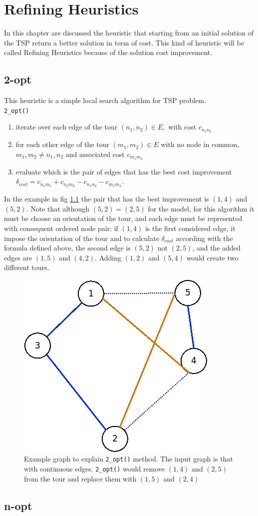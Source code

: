 \chapter{Refining Heuristics}
In this chapter are discussed the heuristic that starting from an initial solution of the TSP return a better solution in term of cost. This kind of heuristic will be called Refining Heuristics because of the solution cost improvement. 

\section{2-opt} \label{sec:best_2_opt}

This heuristic is a simple local search algorithm for TSP problem.\\
\texttt{2\_opt()} 
\begin{enumerate}
	\item iterate over each edge of the tour $ (n_1,n_2) \in E, $ with cost $ c_{n_1n_2} $
	\item for each other edge of the tour $ (m_1, m_2) \in E $ with no node in common, $ m_1,m_2 \ne n_1,n_2 $ and associated cost $ c_{m_1m_2} $
	\item evaluate which is the pair of edges that has the best cost improvement $ \delta_{cost} = c_{n_1m_1} + c_{n_2m_2} - c_{n_1n_2} - c_{m_1m_2} $.
\end{enumerate}
In the example in fig \ref{fig:2_opt_graph} the pair that has the best improvement is $ (1,4) $ and $ (5,2) $. Note that although $ (5,2) = (2,5) $ for the model, for this algorithm it must be choose an orientation of the tour, and each edge must be represented with consequent ordered node pair: if $ (1,4) $ is the first considered edge, it impose the orientation of the tour and to calculate $ \delta_{cost} $ according with the formula defined above, the second edge is $ (5,2) $ not $ (2,5) $, and the added edges are $ (1,5) $ and $ (4,2) $. Adding $ (1,2) $ and $ (5,4) $ would create two different tours.


\begin{figure}[h]
	\centering
	\includegraphics[width=.3\columnwidth]{img/2_opt_graph.png}
	\caption{Example graph to explain \texttt{2\_opt()} method. The input graph is that with continuous edges. \texttt{2\_opt()} would remove $ (1,4) $ and $ (2,5) $ from the tour and replace them with $ (1,5) $ and $  (2,4) $}
	\label{fig:2_opt_graph}
\end{figure}

\section{n-opt}
